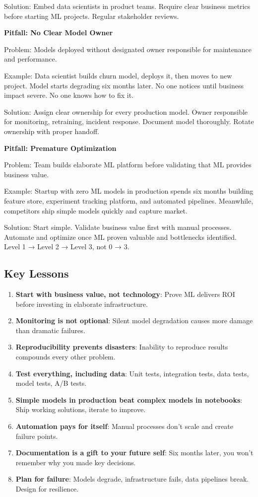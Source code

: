Solution: Embed data scientists in product teams. Require clear business metrics before starting ML projects. Regular stakeholder reviews.

\textbf{Pitfall: No Clear Model Owner}

Problem: Models deployed without designated owner responsible for maintenance and performance.

Example: Data scientist builds churn model, deploys it, then moves to new project. Model starts degrading six months later. No one notices until business impact severe. No one knows how to fix it.

Solution: Assign clear ownership for every production model. Owner responsible for monitoring, retraining, incident response. Document model thoroughly. Rotate ownership with proper handoff.

\textbf{Pitfall: Premature Optimization}

Problem: Team builds elaborate ML platform before validating that ML provides business value.

Example: Startup with zero ML models in production spends six months building feature store, experiment tracking platform, and automated pipelines. Meanwhile, competitors ship simple models quickly and capture market.

Solution: Start simple. Validate business value first with manual processes. Automate and optimize once ML proven valuable and bottlenecks identified. Level 1 → Level 2 → Level 3, not 0 → 3.

\subsection{Key Lessons}

\begin{enumerate}
    \item \textbf{Start with business value, not technology}: Prove ML delivers ROI before investing in elaborate infrastructure.
    \item \textbf{Monitoring is not optional}: Silent model degradation causes more damage than dramatic failures.
    \item \textbf{Reproducibility prevents disasters}: Inability to reproduce results compounds every other problem.
    \item \textbf{Test everything, including data}: Unit tests, integration tests, data tests, model tests, A/B tests.
    \item \textbf{Simple models in production beat complex models in notebooks}: Ship working solutions, iterate to improve.
    \item \textbf{Automation pays for itself}: Manual processes don't scale and create failure points.
    \item \textbf{Documentation is a gift to your future self}: Six months later, you won't remember why you made key decisions.
    \item \textbf{Plan for failure}: Models degrade, infrastructure fails, data pipelines break. Design for resilience.
\end{enumerate}

